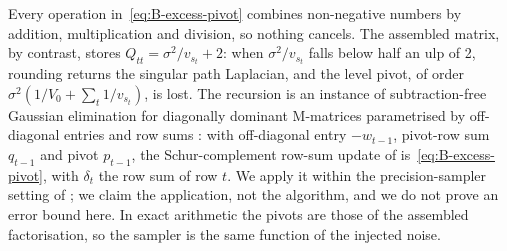 Every operation in~\eqref{eq:B-excess-pivot} combines non-negative numbers by addition,
multiplication and division, so nothing cancels.
The assembled matrix, by contrast, stores $Q_{tt} = \sigma^2/v_{s_t} + 2$: when $\sigma^2/v_{s_t}$ falls below
half an ulp of 2, rounding returns the singular path Laplacian, and the level pivot, of order
$\sigma^2(1/V_0 + \sum_t 1/v_{s_t})$, is lost.
The recursion is an instance of subtraction-free Gaussian elimination for diagonally dominant
M-matrices parametrised by off-diagonal entries and row sums
\citep{grassmann1985regenerative,ocinneide1996relative,alfa2002accurate,ye2008computing}: with
off-diagonal entry $-w_{t-1}$, pivot-row sum $q_{t-1}$ and pivot $p_{t-1}$, the Schur-complement row-sum
update of \citet[Section~2.3.4]{demmel2008accurate} is~\eqref{eq:B-excess-pivot}, with $\delta_t$
the row sum of row $t$. We apply it within the precision-sampler setting of \citet{rue2001fast}; we
claim the application, not the algorithm, and we do not prove an error bound here.
In exact arithmetic the pivots are those of the assembled factorisation, so the sampler is the same
function of the injected noise.

